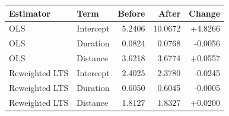 \begin{tabular}{llrrr}
\toprule
Estimator & Term & Before & After & Change \\
\midrule
OLS & Intercept & 5.2406 & 10.0672 & +4.8266 \\
OLS & Duration & 0.0824 & 0.0768 & -0.0056 \\
OLS & Distance & 3.6218 & 3.6774 & +0.0557 \\
Reweighted LTS & Intercept & 2.4025 & 2.3780 & -0.0245 \\
Reweighted LTS & Duration & 0.6050 & 0.6045 & -0.0005 \\
Reweighted LTS & Distance & 1.8127 & 1.8327 & +0.0200 \\
\bottomrule
\end{tabular}
